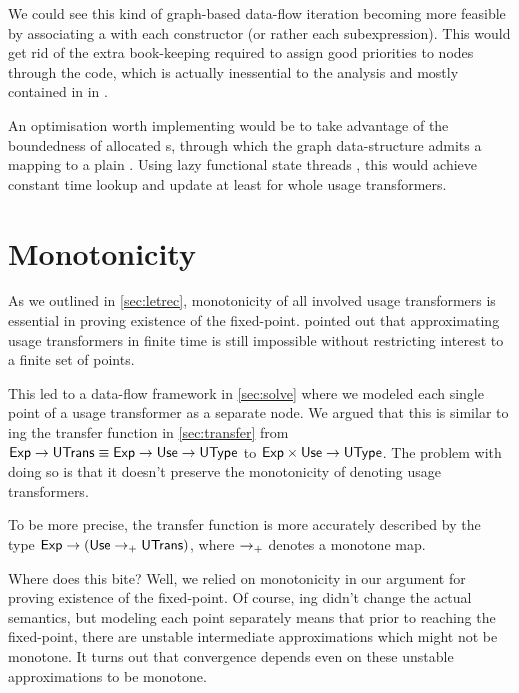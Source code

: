 We could see this kind of graph-based data-flow iteration becoming more feasible by associating a  with each  constructor (or rather each subexpression).
This would get rid of the extra book-keeping required to assign good priorities to nodes through the  code, which is actually inessential to the analysis and mostly contained in  in .

An optimisation worth implementing would be to take advantage of the boundedness of allocated s, through which the graph data-structure admits a mapping to a plain .
Using lazy functional state threads \parencite{statethreads}, this would achieve constant time lookup and update at least for whole usage transformers.

\section{Monotonicity}\label{sec:mono}

As we outlined in \cref{sec:letrec}, monotonicity of all involved usage transformers is essential in proving existence of the fixed-point.
 pointed out that approximating usage transformers in finite time is still impossible without restricting interest to a finite set of points.

This led to a data-flow framework in \cref{sec:solve} where we modeled each single point of a usage transformer as a separate node.
We argued that this is similar to ing the transfer function in \cref{sec:transfer} from $\text{\textsf{Exp}} \to \text{\textsf{UTrans}} \equiv \text{\textsf{Exp}} \to \text{\textsf{Use}} \to \text{\textsf{UType}}$ to $\text{\textsf{Exp}} \times \text{\textsf{Use}} \to \text{\textsf{UType}}$.
The problem with doing so is that it doesn't preserve the monotonicity of denoting usage transformers.

To be more precise, the transfer function is more accurately described by the type $\text{\textsf{Exp}} \to (\text{\textsf{Use}} \to_{+} \text{\textsf{UTrans}})$, where $\to_{+}$ denotes a monotone map.

Where does this bite?
Well, we relied on monotonicity in our argument for proving existence of the fixed-point.
Of course, ing didn't change the actual semantics, but modeling each point separately means that prior to reaching the fixed-point, there are unstable intermediate approximations which might not be monotone.
It turns out that convergence depends even on these unstable approximations to be monotone.

